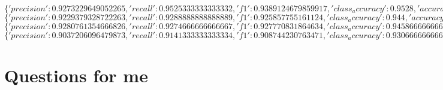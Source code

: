 $\{'precision': 0.9273229649052265, 'recall': 0.9525333333333332, 'f1': 0.9389124679859917, 'class_accuracy': 0.9528, 'accuracy': 0.9527999758720398\}$\\

$\{'precision': 0.9229379328722263, 'recall': 0.9288888888888889, 'f1': 0.925857755161124, 'class_accuracy': 0.944, 'accuracy': 0.9440000057220459\}$\\

$\{'precision': 0.9280761354666826, 'recall': 0.9274666666666667, 'f1': 0.927770831864634, 'class_accuracy': 0.9458666666666666, 'accuracy': 0.9458666443824768\}$\\

$\{'precision': 0.9037206096479873, 'recall': 0.9141333333333334, 'f1': 0.908744230763471, 'class_accuracy': 0.9306666666666666, 'accuracy': 0.9306666851043701\}$



\section{Questions for me}

